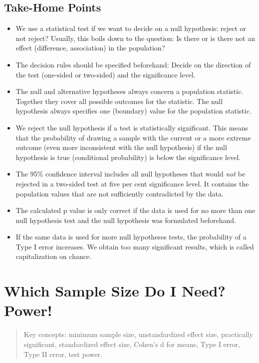 \documentclass[a4paper]{book}
\theoremstyle{definition}
\theoremstyle{definition}
\theoremstyle{definition}
\theoremstyle{remark}
\begin{document}
\section{Take-Home Points}\label{take-home-points-3}

\begin{itemize}
\item
  We use a statistical test if we want to decide on a null hypothesis:
  reject or not reject? Usually, this boils down to the question: Is
  there or is there not an effect (difference, association) in the
  population?
\item
  The decision rules should be specified beforehand: Decide on the
  direction of the test (one-sided or two-sided) and the significance
  level.
\item
  The null and alternative hypotheses always concern a population
  statistic. Together they cover all possible outcomes for the
  statistic. The null hypothesis always specifies one (boundary) value
  for the population statistic.
\item
  We reject the null hypothesis if a test is statistically significant.
  This means that the probability of drawing a sample with the current
  or a more extreme outcome (even more inconsistent with the null
  hypothesis) if the null hypothesis is true (conditional probability)
  is below the significance level.
\item
  The 95\% confidence interval includes all null hypotheses that would
  \emph{not} be rejected in a two-sided test at five per cent
  significance level. It contains the population values that are not
  sufficiently contradicted by the data.
\item
  The calculated p value is only correct if the data is used for no more
  than one null hypothesis test and the null hypothesis was formulated
  beforehand.
\item
  If the same data is used for more null hypotheses tests, the
  probability of a Type I error increases. We obtain too many
  significant results, which is called capitalization on chance.
\end{itemize}

\chapter{Which Sample Size Do I Need? Power!}\label{power}

\begin{quote}
Key concepts: minimum sample size, unstandardized effect size,
practically significant, standardized effect size, Cohen's d for means,
Type I error, Type II error, test power.
\end{quote}
\end{document}
